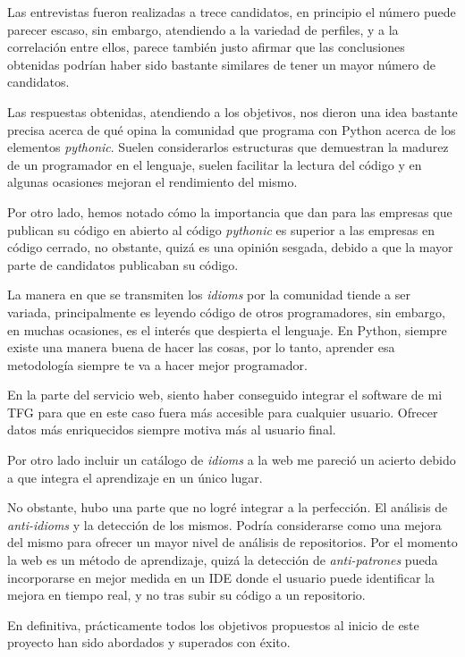 \documentclass[a4paper, 12pt]{book}
\begin{document}
Las entrevistas fueron realizadas a trece candidatos, en principio el número puede parecer escaso, sin embargo, atendiendo a la variedad de perfiles, y a la correlación entre ellos, parece también justo afirmar que las conclusiones obtenidas podrían haber sido bastante similares de tener un mayor número de candidatos.

Las respuestas obtenidas, atendiendo a los objetivos, nos dieron una idea bastante precisa acerca de qué opina la comunidad que programa con Python acerca de los elementos \textit{pythonic}. Suelen considerarlos estructuras que demuestran la madurez de un programador en el lenguaje, suelen facilitar la lectura del código y en algunas ocasiones mejoran el rendimiento del mismo.

Por otro lado, hemos notado cómo la importancia que dan para las empresas que publican su código en abierto al código \textit{pythonic} es superior a las empresas en código cerrado, no obstante, quizá es una opinión sesgada, debido a que la mayor parte de candidatos publicaban su código.

La manera en que se transmiten los \textit{idioms} por la comunidad tiende a ser variada, principalmente es leyendo código de otros programadores, sin embargo, en muchas ocasiones, es el interés que despierta el lenguaje. En Python, siempre existe una manera buena de hacer las cosas\cite{peters2010zen}, por lo tanto, aprender esa metodología siempre te va a hacer mejor programador.

En la parte del servicio web, siento haber conseguido integrar el software de mi TFG para que en este caso fuera más accesible para cualquier usuario. Ofrecer datos más enriquecidos siempre motiva más al usuario final.

Por otro lado incluir un catálogo de \textit{idioms} a la web me pareció un acierto debido a que integra el aprendizaje en un único lugar.

No obstante, hubo una parte que no logré integrar a la perfección. El análisis de \textit{anti-idioms} y la detección de los mismos. Podría considerarse como una mejora del mismo para ofrecer un mayor nivel de análisis de repositorios. Por el momento la web es un método de aprendizaje, quizá la detección de \textit{anti-patrones} pueda incorporarse en mejor medida en un IDE donde el usuario puede identificar la mejora en tiempo real, y no tras subir su código a un repositorio.

En definitiva, prácticamente todos los objetivos propuestos al inicio de este proyecto han sido abordados y superados con éxito.
\end{document}
